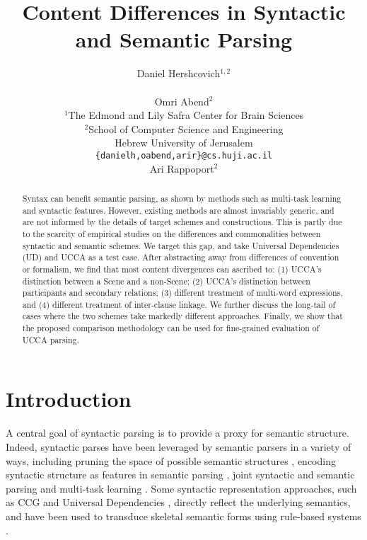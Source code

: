 \documentclass[11pt,a4paper]{article}
\title{Content Differences in Syntactic and Semantic Parsing}
\author{Daniel Hershcovich$^{1,2}$ \\
  \\\And
  Omri Abend$^2$ \\
  $^1$The Edmond and Lily Safra Center for Brain Sciences \\
  $^2$School of Computer Science and Engineering \\
  Hebrew University of Jerusalem \\
  \texttt{\{danielh,oabend,arir\}@cs.huji.ac.il}
  \\\And
  Ari Rappoport$^2$
}
\date{}
\begin{document}
\maketitle

\begin{abstract}
  Syntax can benefit semantic parsing,
  as shown by methods such as multi-task learning and syntactic features.
  However, existing methods are almost invariably generic,
  and are not informed by the details of target schemes and constructions.
  This is partly due to the scarcity of empirical
  studies on the differences and commonalities between syntactic and semantic schemes.
  We target this gap, and take Universal Dependencies (UD) and UCCA as a test case.
  After abstracting away from differences of convention or formalism,
  we find that most content divergences can ascribed to: 
  (1) UCCA's distinction between a Scene and a non-Scene; %
  (2) UCCA's distinction between participants and secondary relations; %
  (3) different treatment of multi-word expressions, and
  (4) different treatment of inter-clause linkage.
  We further discuss the long-tail of cases where the two schemes take markedly
  different approaches.
  Finally, we show that the proposed comparison methodology can be used
  for fine-grained evaluation of UCCA parsing.
\end{abstract}


\section{Introduction}\label{sec:introduction}

  A central goal of syntactic parsing is to provide a proxy for semantic structure.
  Indeed, syntactic parses have been leveraged by semantic parsers in a variety of ways,
  including pruning the space of possible semantic structures \cite{xue2004calibrating}, 
  encoding syntactic structure as features in semantic parsing \cite{gildea2002automatic}, 
  joint syntactic and semantic parsing \cite{surdeanu2008conll,hajivc2009conll} and
  multi-task learning \cite{swayamdipta2018syntactic}. 
  Some syntactic representation approaches, such as CCG \cite{Steedman:00} and Universal Dependencies \cite[UD; ][]{nivre2016universal},
  directly reflect the underlying semantics, and have been used to
  transduce skeletal semantic forms using rule-based systems \cite{Basile:12,white2016universal,reddy2017universal}.
  
\end{document}

